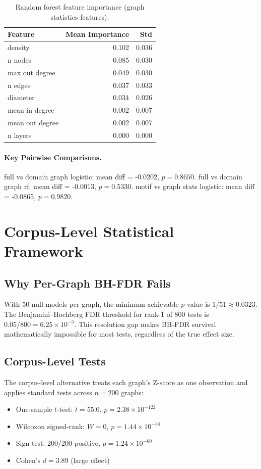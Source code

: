 \documentclass[11pt,a4paper]{article}
\begin{document}
\begin{table}[htbp]
\centering
\caption{Random forest feature importance (graph statistics features).}
\label{tab:feat-importance}
\begin{tabular}{lrr}
\toprule
Feature & Mean Importance & Std \\
\midrule
density & 0.102 & 0.036 \\
n nodes & 0.085 & 0.030 \\
max out degree & 0.049 & 0.030 \\
n edges & 0.037 & 0.033 \\
diameter & 0.034 & 0.026 \\
mean in degree & 0.002 & 0.007 \\
mean out degree & 0.002 & 0.007 \\
n layers & 0.000 & 0.000 \\
\bottomrule
\end{tabular}
\end{table}

\paragraph{Key Pairwise Comparisons.}
full vs domain graph  logistic: mean diff = -0.0202, $p = 0.8650$. 
full vs domain graph  rf: mean diff = -0.0013, $p = 0.5330$. 
motif vs graph stats  logistic: mean diff = -0.0865, $p = 0.9820$. 


\section{Corpus-Level Statistical Framework}

\subsection{Why Per-Graph BH-FDR Fails}
With 50 null models per graph, the minimum achievable $p$-value is $1/51 \approx 0.0323$. The Benjamini--Hochberg FDR threshold for rank-1 of 800 tests is $0.05/800 = 6.25 \times 10^{-5}$. This resolution gap makes BH-FDR survival mathematically impossible for most tests, regardless of the true effect size.

\subsection{Corpus-Level Tests}
The corpus-level alternative treats each graph's Z-score as one observation and applies standard tests across $n=200$ graphs:
\begin{itemize}
\item One-sample $t$-test: $t = 55.0$, $p = 2.38 \times 10^{-122}$
\item Wilcoxon signed-rank: $W = 0$, $p = 1.44 \times 10^{-34}$
\item Sign test: 200/200 positive, $p = 1.24 \times 10^{-60}$
\item Cohen's $d = 3.89$ (large effect)
\end{itemize}
\end{document}
